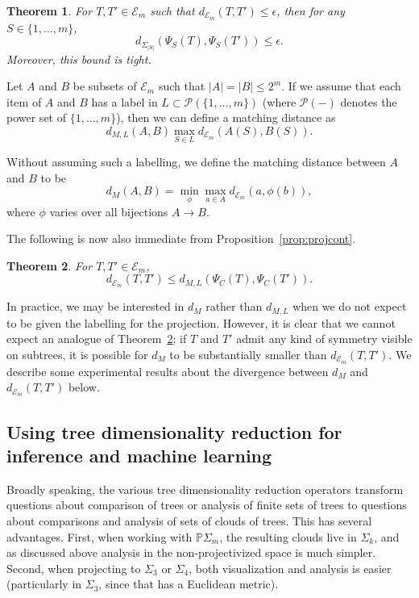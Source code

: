\documentclass[a4paper,11pt]{article}
\newtheorem{theorem}{Theorem}
\newcommand{\aE}{\mathcal{E}}
\newcommand{\aP}{\mathcal{P}}
\begin{document}
\begin{theorem}
For $T,T' \in \aE_m$ such that $d_{\aE_m}(T,T') \leq \epsilon$, then for any $S \in \{1,\ldots,m\}$,
\[
d_{\Sigma_{|S|}}(\Psi_S(T), \Psi_S(T')) \leq \epsilon.
\]
Moreover, this bound is tight.
\end{theorem}

Let $A$ and $B$ be subsets of $\aE_m$ such that $|A| = |B| \leq 2^m$.  
If we assume that each item of $A$ and $B$ has a label in $L \subset \aP(\{1,\ldots,m\})$ (where $\aP(-)$ denotes the power set of $\{1,\ldots,m\}$), then we can define a matching distance as
\[
d_{M,L}(A,B) \max_{S \in L} d_{\aE_m}(A(S), B(S)).
\]

Without assuming such a labelling, we define the matching distance between $A$ and $B$ to be 
\[
d_M(A,B) = \min_{\phi} \max_{a \in A} d_{\aE_m}(a,\phi(b)),
\]
where $\phi$ varies over all bijections $A \to B$.

The following is now also immediate from Proposition~\ref{prop:projcont}.

\begin{theorem}\label{thm:converse}
For $T, T' \in \aE_m$, 
\[
d_{\aE_m}(T,T') \leq d_{M,L}(\Psi_C(T), \Psi_C(T')).
\]
\end{theorem}

In practice, we may be interested in $d_M$ rather than $d_{M,L}$ when we do not expect to be given the labelling for the projection.
However, it is clear that we cannot expect an analogue of Theorem~\ref{thm:converse}; if $T$ and $T'$ admit any kind of symmetry visible on subtrees, it is possible for $d_M$ to be substantially smaller than $d_{\aE_m}(T,T')$.
We describe some experimental results about the divergence between $d_M$ and $d_{\aE_m}(T,T')$ below.

\subsection{Using tree dimensionality reduction for inference and machine learning}

Broadly speaking, the various tree dimensionality reduction operators transform questions about comparison of trees or analysis of finite sets of trees to questions about comparisons and analysis of sets of clouds of trees.
This has several advantages.
First, when working with $\mathbb{P}\Sigma_m$, the resulting clouds live in $\Sigma_k$, and as discussed above analysis in the non-projectivized space is much simpler.
Second, when projecting to $\Sigma_3$ or $\Sigma_4$, both visualization and analysis is easier (particularly in $\Sigma_3$, since that has a Euclidean metric).
\end{document}
